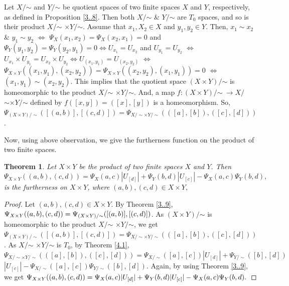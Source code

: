 \documentclass[12pt]{amsart}
\newtheorem{theorem}[definition]{Theorem}
\begin{document}
Let $X/$$\sim$ and $Y/$$\sim$ be quotient spaces of two finite spaces $X$ and $Y$, respectively, as defined in Proposition \ref{3..8}. Then both  $X/$$\sim$ $\&$ $Y/$$\sim$ are $T_0$ spaces, and so is their product  $X/$$\sim$ $\times Y/$$\sim$. Assume that $x_1,X_2\in X$ and $y_1,y_2\in Y$. Then, $x_1\sim x_2$ $\&$ $ y_1\sim y_2$ $\iff$ $\Psi_X(x_1,x_2)=\Psi_X(x_2,x_1)=0$ and $\Psi_Y(y_1,y_2)=\Psi_Y(y_2,y_1)=0 \iff U_{x_1}=U_{x_2}$ and $U_{y_1}=U_{y_2}$ $\iff$ $U_{x_1}\times U_{y_1} = U_{x_2}\times U_{y_2} \iff U_{(x_1,y_1)}=U_{(x_2,y_2)}$ $\iff$ $\Psi_{X\times Y}((x_1,y_1),(x_2,y_2))=\Psi_{X\times Y}((x_2,y_2),(x_1,y_1))=0$ $\iff$ $(x_1,y_1)\sim (x_2,y_2)$. This implies that the quotient space $(X\times Y)/$$\sim$ is homeomorphic to the product  $X/$$\sim$ $\times Y/$$\sim$. And, a map  $f:(X\times Y)/$$\sim~ \longrightarrow  X/$$\sim \times Y/$$\sim$ defined by  $f([x,y])=([x],[y])$ is a homeomorphism. So, $\Psi_{(X\times Y)/\sim}([(a,b)],[(c,d)])=\Psi_{X/\sim \times Y/\sim}(([a],[b]),([c],[d]))$.



Now, using above observation, we give the furtherness function on the product of two finite spaces.



\begin{theorem}\label{4.1.}
	Let $X\times Y$ be the product of two finite spaces $X$ and $Y$. Then $\Psi_{X\times Y}((a,b),(c,d))=\Psi_{X}(a,c)|U_{[d]}|+\Psi_{Y}(b,d)|U_{[c]}|-\Psi_{X}(a,c)\Psi_{Y}(b,d),$ is the furtherness on $X\times Y$, where $(a,b),(c,d)\in X\times Y,$ 
\end{theorem}

\begin{proof}
	Let $(a,b),(c,d)\in X\times Y.$ By Theorem \ref{3..9}, $\Psi_{X\times Y}((a,b),(c,d))=\Psi_{(X\times Y)/\sim}\\
	([(a,b)],[(c,d)])$. As $(X\times Y)/$$\sim$ is homeomorphic to the product  $X/$$\sim$ $\times Y/$$\sim$, we get $\Psi_{(X\times Y)/\sim}([(a,b)],[(c,d)])=\Psi_{X/\sim \times Y/\sim}(([a],[b]),([c],[d]))$. As  $X/$$\sim$ $\times Y/$$\sim$ is $T_0$, by Theorem \ref{4.1},  $\Psi_{X/\sim \times Y/\sim}(([a],[b]),([c],[d]))= \Psi_{X/\sim}([a],[c])|U_{[d]}|+\Psi_{Y/\sim}([b],[d])$
	$|U_{[c]}|-\Psi_{X/\sim}([a],[c])\Psi_{ Y/\sim}([b],[d]).$ Again, by using Theorem \ref{3..9}, we get $\Psi_{X\times Y}((a,b),\\
	(c,d))=\Psi_{X}(a,c)|U_{[d]}|+\Psi_{Y}(b,d)|U_{[c]}|-\Psi_{X}(a,c)\Psi_{Y}(b,d).$
\end{proof}
\end{document}
